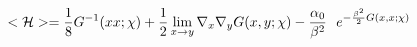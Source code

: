 \begin{equation}
< {\cal{H}} > = {1 \over 8} G^{-1}(xx;\chi) + {1 \over 2}
\lim_{x \rightarrow y}  \nabla_x \nabla_y G(x,y;\chi)
 - {\alpha_0 \over \beta^2}~~ e^{- {\beta^2 \over 2} G(x,x;\chi)}
\end{equation}

